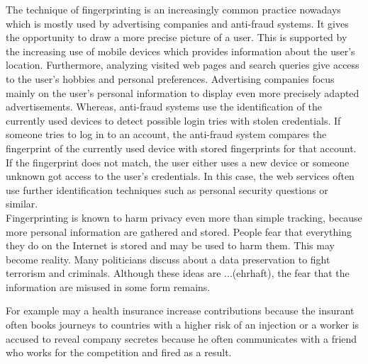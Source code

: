 			The technique of fingerprinting is an increasingly common practice nowadays which is mostly used by advertising companies and anti-fraud systems. It gives the opportunity to draw a more precise picture of a user. This is supported by the increasing use of mobile devices which provides information about the user's location. Furthermore, analyzing visited web pages and search queries give access to the user's hobbies and personal preferences. Advertising companies focus mainly on the user's personal information to display even more precisely adapted advertisements. Whereas, anti-fraud systems use the identification of the currently used devices to detect possible login tries with stolen credentials. If someone tries to log in to an account, the anti-fraud system compares the fingerprint of the currently used device with stored fingerprints for that account. If the fingerprint does not match, the user either uses a new device or someone unknown got access to the user's credentials. In this case, the web services often use further identification techniques such as personal security questions or similar. \\
			
			Fingerprinting is known to harm privacy even more than simple tracking, because more personal information are gathered and stored. People fear that everything they do on the Internet is stored and may be used to harm them. This may become reality. Many politicians discuss about a data preservation to fight terrorism and criminals. Although these ideas are ...(ehrhaft), the fear that the information are misused in some form remains. %
			
			For example may a health insurance increase contributions because the insurant often books journeys to countries with a higher risk of an injection or a worker is accused to reveal company secretes because he often communicates with a friend who works for the competition and fired as a result. \\
			
			
			
			
